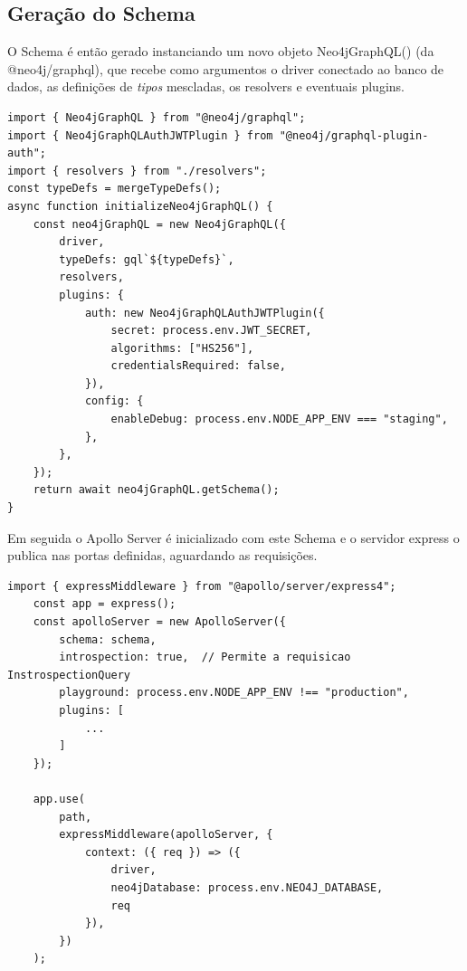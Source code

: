 \subsection{Geração do Schema}

 O Schema é então gerado instanciando um novo objeto Neo4jGraphQL() (da @neo4j/graphql), que recebe como argumentos o driver conectado ao banco de dados, as definições de \textit{tipos} mescladas, os resolvers e eventuais plugins.

\begin{lstlisting}
import { Neo4jGraphQL } from "@neo4j/graphql";
import { Neo4jGraphQLAuthJWTPlugin } from "@neo4j/graphql-plugin-auth";
import { resolvers } from "./resolvers";
const typeDefs = mergeTypeDefs();
async function initializeNeo4jGraphQL() {
	const neo4jGraphQL = new Neo4jGraphQL({
		driver,
		typeDefs: gql`${typeDefs}`,
		resolvers,
		plugins: {
			auth: new Neo4jGraphQLAuthJWTPlugin({
				secret: process.env.JWT_SECRET,
				algorithms: ["HS256"],
				credentialsRequired: false,
			}),
			config: {
				enableDebug: process.env.NODE_APP_ENV === "staging",
			},
		},
	});
	return await neo4jGraphQL.getSchema();
}
\end{lstlisting}

Em seguida o Apollo Server é inicializado com este Schema e o servidor express o publica nas portas definidas, aguardando as requisições.

\begin{lstlisting}
import { expressMiddleware } from "@apollo/server/express4";
    const app = express();
	const apolloServer = new ApolloServer({
		schema: schema,
		introspection: true,  // Permite a requisicao InstrospectionQuery
		playground: process.env.NODE_APP_ENV !== "production",
		plugins: [
            ...
		]
	});

	app.use(
		path,
		expressMiddleware(apolloServer, {
			context: ({ req }) => ({
				driver,
				neo4jDatabase: process.env.NEO4J_DATABASE,
				req
			}),
		})
	);
\end{lstlisting}




